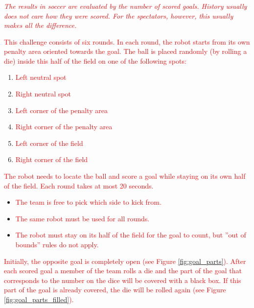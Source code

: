 \documentclass{article}
\begin{document}
\subsubsection{}

\textcolor{red}{\textit{The results in soccer are evaluated by the number of
scored goals. History usually does not care how they were scored. For
the spectators, however, this usually makes all the difference.}}

\textcolor{red}{This challenge consists of six rounds. In each round, the robot
starts from its own penalty area oriented towards the goal. The ball is
placed randomly (by rolling a die) inside this half of the field on one of
the following spots:}

\begin{enumerate}
    \item \textcolor{red}{Left neutral spot}
    \item \textcolor{red}{Right neutral spot}
    \item \textcolor{red}{Left corner of the penalty area}
    \item \textcolor{red}{Right corner of the penalty area}
    \item \textcolor{red}{Left corner of the field}
    \item \textcolor{red}{Right corner of the field}
\end{enumerate}

\textcolor{red}{The robot needs to locate the ball and score a goal while
staying on its own half of the field. Each round takes at most 20 seconds.}

\begin{itemize}
    \item \textcolor{red}{The team is free to pick which side to kick from.}
    \item \textcolor{red}{The same robot must  be used for all rounds.}
    \item \textcolor{red}{The robot must stay on its half of the field for the
            goal to count, but ''out of bounds'' rules do not apply.}
\end{itemize}

\textcolor{red}{Initially, the opposite goal is completely open (see Figure
\ref{fig:goal_parts}). After each
scored goal a member of the team rolls a die and the part of the goal that
corresponds to the number on the dice will be covered with a black box. If
this part of the goal is already covered, the die will be rolled again (see
Figure \ref{fig:goal_parts_filled}).}
\end{document}
